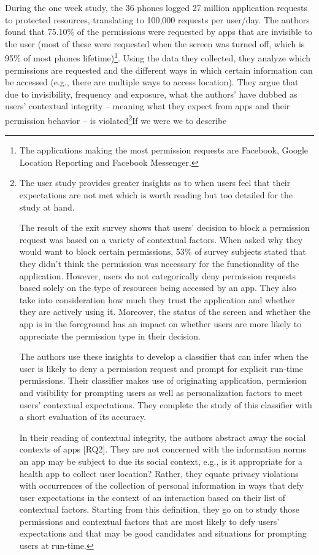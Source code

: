 \documentclass[../thesis.tex]{subfiles}
\begin{document}
During the one week study, the 36 phones logged 27 million application
requests to protected resources, translating to 100,000 requests per
user/day. The authors found that 75.10\% of the permissions were
requested by apps that are invisible to the user (most of these were
requested when the screen was turned off, which is 95\% of most phones
lifetime)\footnote{ The applications making the most permission
requests are Facebook, Google Location Reporting and Facebook
Messenger.}. Using the data they collected, they analyze which
permissions are requested and the different ways in which certain
information can be accessed (e.g., there are multiple ways to access
location). They argue that due to invisibility, frequency and exposure,
what the authors' have dubbed as users'
contextual integrity -- meaning what they expect from apps and their
permission behavior -- is violated\footnote{
The user study provides greater insights
as to when users feel that their expectations are not met which is
worth reading but too detailed for the study at hand. 

The result of the exit survey shows that
users' decision to block a permission request was based
on a variety of contextual factors. When asked why they would want to
block certain permissions, 53\% of survey subjects stated that they
didn't think the permission was necessary for the
functionality of the application. However,
users do not categorically deny permission
requests based solely on the type of resources being accessed by an
app. They also take into consideration how much they trust the
application and whether they are actively using it. Moreover, the
status of the screen and whether the app is in the foreground has an
impact on whether users are more likely to appreciate the permission
type in their decision.

The authors use these insights to develop a
classifier that can infer when the user is likely to deny a permission
request and prompt for explicit run-time permissions. Their classifier
makes use of originating application, permission and visibility for
prompting users as well as personalization factors to meet
users' contextual expectations. They complete the study
of this classifier with a short evaluation of its accuracy.

In their reading of contextual integrity,
the authors abstract away the social contexts of apps [RQ2]. They are
not concerned with the information norms an app may be subject to due
its social context, e.g., is it appropriate for a health app to collect
user location? Rather, they equate privacy violations with occurrences
of the collection of personal information in ways that defy user
expectations in the context of an interaction based on their list of
contextual factors. Starting from this definition, they go on to study
those permissions and contextual factors that are most likely to defy
users' expectations and that may be good candidates and
situations for prompting users at run-time. }If we were we to describe
\end{document}
